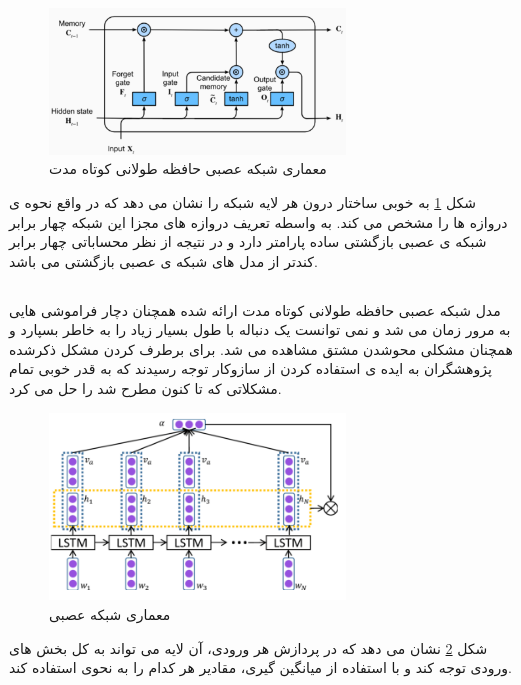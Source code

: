 \begin{figure}[H]
	\centering
	\includegraphics[width=0.7\textwidth]{figures/LSTM.png}
	\caption{معماری شبکه عصبی حافظه طولانی کوتاه مدت}
	\label{fig:LSTM}
\end{figure}

شکل  \ref{fig:LSTM} به خوبی ساختار درون هر لایه شبکه را نشان می دهد که در واقع نحوه ی دروازه ها را مشخص
می کند. به واسطه تعریف دروازه های مجزا این شبکه چهار برابر شبکه ی عصبی بازگشتی ساده پارامتر دارد و در نتیجه از
نظر محساباتی چهار برابر کندتر از مدل های شبکه ی عصبی بازگشتی می باشد.
\cite{LINDEMANN2021650}

\subsection{}
مدل شبکه عصبی حافظه طولانی کوتاه مدت ارائه شده همچنان دچار فراموشی هایی به مرور زمان می شد و نمی توانست یک دنباله با طول بسیار زیاد را
به خاطر بسپارد و همچنان مشکلی محوشدن مشتق مشاهده می شد. برای برطرف کردن مشکل ذکرشده پژوهشگران به ایده ی استفاده کردن از سازوکار توجه رسیدند که به قدر خوبی تمام مشکلاتی که تا کنون مطرح شد را حل می کرد.
\begin{figure}[H]
	\centering
	\includegraphics[width=0.7\textwidth]{figures/Attention.png}
	\caption{معماری شبکه عصبی }
	\label{fig:Attention}
\end{figure}
شکل  \ref{fig:Attention} نشان می دهد که در پردازش هر ورودی، آن لایه می تواند به کل بخش های ورودی توجه کند و با استفاده
از میانگین گیری، مقادیر هر کدام را به نحوی استفاده کند.
\cite{vaswani2017attention}

